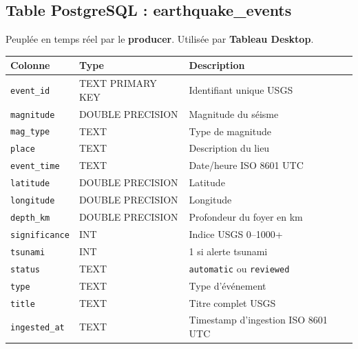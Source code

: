 \documentclass[12pt,a4paper]{article}
\begin{document}
\subsection{Table PostgreSQL : earthquake\_events}

Peuplée en temps réel par le \textbf{producer}. Utilisée par \textbf{Tableau Desktop}.

\begin{center}
\begin{tabularx}{\textwidth}{llX}
  \toprule
  \textbf{Colonne} & \textbf{Type} & \textbf{Description} \\
  \midrule
  \texttt{event\_id}   & TEXT PRIMARY KEY & Identifiant unique USGS \\
  \texttt{magnitude}   & DOUBLE PRECISION & Magnitude du séisme \\
  \texttt{mag\_type}   & TEXT & Type de magnitude \\
  \texttt{place}       & TEXT & Description du lieu \\
  \texttt{event\_time} & TEXT & Date/heure ISO 8601 UTC \\
  \texttt{latitude}    & DOUBLE PRECISION & Latitude \\
  \texttt{longitude}   & DOUBLE PRECISION & Longitude \\
  \texttt{depth\_km}   & DOUBLE PRECISION & Profondeur du foyer en km \\
  \texttt{significance}& INT & Indice USGS 0--1000+ \\
  \texttt{tsunami}     & INT & 1 si alerte tsunami \\
  \texttt{status}      & TEXT & \texttt{automatic} ou \texttt{reviewed} \\
  \texttt{type}        & TEXT & Type d'événement \\
  \texttt{title}       & TEXT & Titre complet USGS \\
  \texttt{ingested\_at}& TEXT & Timestamp d'ingestion ISO 8601 UTC \\
  \bottomrule
\end{tabularx}
\end{center}
\end{document}
